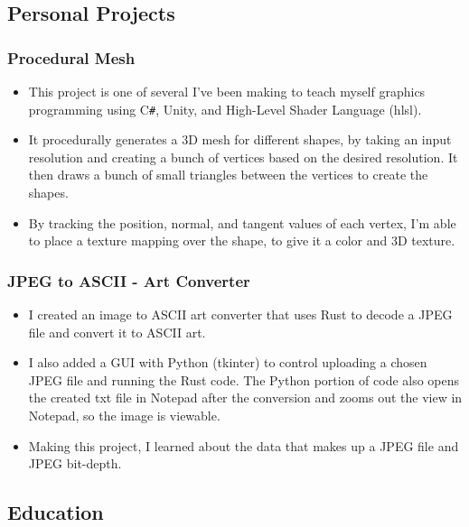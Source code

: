 \documentclass{article}
\begin{document}
\subsection*{Personal Projects}
\subsubsection*{\hspace*{0.15cm} Procedural Mesh}

\begin{itemize}
    \item This project is one of several I've been making to teach myself 
     graphics programming using C\verb|#|, Unity, and High-Level Shader Language (hlsl).
    \item It procedurally generates a 3D mesh for different shapes, by taking
     an input resolution and creating a bunch of vertices based on the desired resolution.
     It then draws a bunch of small triangles between the vertices to create the
     shapes. 
    \item By tracking the position, normal, and tangent values of each vertex, I'm
     able to place a texture mapping over the shape, to give it a color and 3D texture. 
\end{itemize}

\subsubsection*{\hspace*{0.15cm} JPEG to ASCII - Art Converter}

\begin{itemize}
    \item I created an image to ASCII art converter that uses Rust to decode a JPEG file and
     convert it to ASCII art.
    \item I also added a GUI with Python (tkinter) to control uploading a chosen JPEG file and running
    the Rust code. The Python portion of code also opens the created txt file in Notepad after the 
    conversion and zooms out the view in Notepad, so the image is viewable.
    \item Making this project, I learned about the data that makes up a JPEG file and JPEG bit-depth. 
\end{itemize}


\subsection*{Education}
\end{document}
